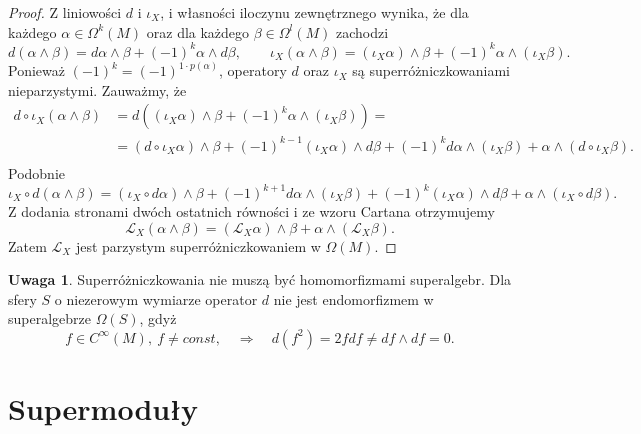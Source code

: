 \documentclass[11pt,a4paper]{report}
\theoremstyle{definition}
\newtheorem{remark}[theorem]{Uwaga}
\begin{document}
\begin{proof}
Z liniowości $d$ i $\iota_X$, i własności iloczynu zewnętrznego wynika, że dla każdego $\alpha \in \Omega^k(M)$ oraz dla każdego $\beta \in \Omega^l(M)$ zachodzi
\begin{equation*} 
d(\alpha \wedge \beta) = d\alpha \wedge \beta + (-1)^{k} \alpha \wedge d \beta,\qquad \iota_X(\alpha \wedge \beta) = (\iota_X \alpha) \wedge \beta + (-1)^{k} \alpha \wedge (\iota_X \beta).
\end{equation*}
Ponieważ $(-1)^k = (-1)^{1 \cdot p(\alpha)}$, operatory $d$ oraz $\iota_X$ są superróżniczkowaniami nieparzystymi. Zauważmy, że
\begin{equation*} 
\begin{aligned}
d \circ \iota_X (\alpha \wedge \beta) &= d((\iota_X \alpha) \wedge \beta + (-1)^{k} \alpha \wedge (\iota_X \beta)) = \\
&= (d \circ \iota_X \alpha) \wedge \beta + (-1)^{k-1} (\iota_X \alpha) \wedge d \beta + (-1)^k d\alpha \wedge (\iota_X \beta) + \alpha \wedge (d \circ \iota_X \beta). \\
\end{aligned}
\end{equation*}
Podobnie 
\begin{equation*} 
\iota_X \circ d (\alpha \wedge \beta) = (\iota_X \circ d \alpha) \wedge \beta + (-1)^{k+1} d \alpha \wedge (\iota_X \beta) + (-1)^k (\iota_X \alpha) \wedge d \beta + \alpha \wedge (\iota_X \circ d \beta).
\end{equation*}
Z dodania stronami dwóch ostatnich równości i ze wzoru Cartana otrzymujemy
\begin{equation*}
\mathcal{L}_X(\alpha \wedge \beta) = (\mathcal{L}_X \alpha) \wedge \beta + \alpha \wedge (\mathcal{L}_X \beta).
\end{equation*}
Zatem $\mathcal{L}_X$ jest parzystym superróżniczkowaniem w $\Omega(M)$.
\end{proof}

\begin{remark}
 Superróżniczkowania nie muszą być homomorfizmami superalgebr. Dla sfery $S$ o niezerowym wymiarze operator $d$ nie jest endomorfizmem w superalgebrze $\Omega(S)$, gdyż
 \begin{equation*}
  f\in C^{\infty}(M),\ f \neq const, \quad \Rightarrow \quad d(f^2) = 2fdf \neq df \wedge df = 0.
 \end{equation*}
\end{remark}

\section{Supermoduły}
\end{document}
